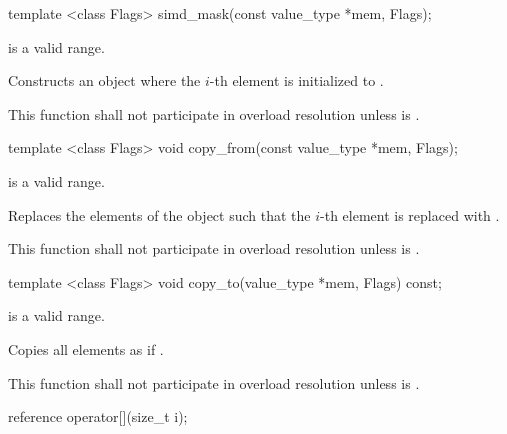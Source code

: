 \begin{itemdecl}
template <class Flags> simd_mask(const value_type *mem, Flags);
\end{itemdecl}
\begin{itemdescr}
  \flagsRequires{\mask{}}
  \code{[mem, mem + size())} is a valid range.

  \pnum\effects Constructs an object where the $i$-th element is initialized to  \foralli.

  \pnum\remarks This function shall not participate in overload resolution unless  is \true.
\end{itemdescr}

\begin{itemdecl}
template <class Flags> void copy_from(const value_type *mem, Flags);
\end{itemdecl}
\begin{itemdescr}
  \flagsRequires{\mask{}}
  \code{[mem, mem + size())} is a valid range.

  \pnum\effects Replaces the elements of the \mask object such that the $i$-th element is replaced with  \foralli.

  \pnum\remarks This function shall not participate in overload resolution unless  is \true.
\end{itemdescr}

\begin{itemdecl}
template <class Flags> void copy_to(value_type *mem, Flags) const;
\end{itemdecl}
\begin{itemdescr}
  \flagsRequires{\mask{}}
  \code{[mem, mem + size())} is a valid range.

  \pnum\effects Copies all \mask elements as if  \foralli.

  \pnum\remarks This function shall not participate in overload resolution unless  is \true.
\end{itemdescr}

\begin{itemdecl}
reference operator[](size_t i);
\end{itemdecl}
\begin{itemdescr}
  \simdElementReference{\mask{}}
\end{itemdescr}

